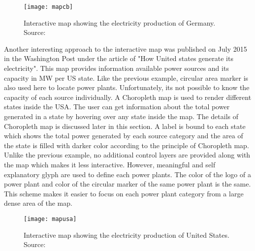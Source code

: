 \begin{figure}
  \begin{center}
    \texttt{[image: mapcb]}
    \caption[Interactive map showing the electricity production of Germany.]{Interactive map showing the electricity production of Germany. Source:\cite{cbg2016}}
    \label{fig:mapcb}
  \end{center}
\end{figure}

Another interesting approach to the interactive map was published on July 2015 in the Washington Post \cite{wp2015} under the article of "How United states generate its electricity". This map provides information available power sources and its capacity in MW per US state. Like the previous example, circular area marker is also used here to locate power plants. Unfortunately, its not possible to know the capacity of each source individually. A Choropleth map is used to render different states inside the USA. The user can get information about the total power generated in a state by hovering over any state inside the map. The details of Choropleth map is discussed later in this section. A label is bound to each state which shows the total power generated by each source category and the area of the state is filled with darker color according to the principle of Choropleth map. Unlike the previous example, no additional control layers are provided along with the map which makes it less interactive. However, meaningful and self explanatory glyph are used to define each power plants. The color of the logo of a power plant and color of the circular marker of the same power plant is the same. This scheme makes it easier to focus on each power plant category from a large dense area of the map.

\begin{figure}
  \begin{center}
    \texttt{[image: mapusa]}
    \caption[Interactive map showing the electricity production of United States]{Interactive map showing the electricity production of United States. Source:\cite{wp2015}}
    \label{fig:mapusa}
  \end{center}
\end{figure}

